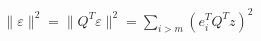 \documentclass[10pt]{article}
\begin{document}
\begin{align*}\lVert \varepsilon \rVert^2 = \lVert Q^T \varepsilon \rVert^2 = \sum_{i>m} \left( e_i^T Q^T z \right)^2\end{align*}
\end{document}
